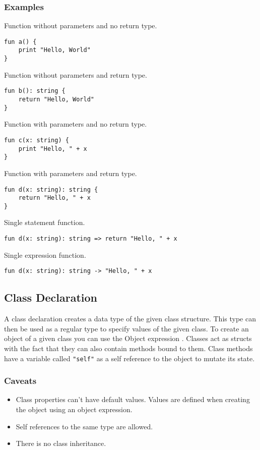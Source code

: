 \subsubsection{Examples}

Function without parameters and no return type.
\begin{lstlisting}
fun a() {
    print "Hello, World"
}
\end{lstlisting}
Function without parameters and return type.
\begin{lstlisting}
fun b(): string {
    return "Hello, World"
}
\end{lstlisting}
Function with parameters and no return type.
\begin{lstlisting}
fun c(x: string) {
    print "Hello, " + x
}
\end{lstlisting}
Function with parameters and return type.
\begin{lstlisting}
fun d(x: string): string {
    return "Hello, " + x
}
\end{lstlisting}
Single statement function.
\begin{lstlisting}
fun d(x: string): string => return "Hello, " + x
\end{lstlisting}
Single expression function.
\begin{lstlisting}
fun d(x: string): string -> "Hello, " + x
\end{lstlisting}

\subsection{Class Declaration}

A class declaration creates a data type of the given class structure. This type can then be used as a regular type
to specify values of the given class. To create an object of a given class you can use the Object expression \autocite{sec:object_expression}.
Classes act as structs with the fact that they can also contain methods bound to them. Class methods have a variable called \texttt{"self"}
as a self reference to the object to mutate its state.

\subsubsection{Caveats}

\begin{itemize}
    \item Class properties can't have default values. Values are defined when creating the object using an object expression.
    \item Self references to the same type are allowed.
    \item There is no class inheritance.
\end{itemize}

